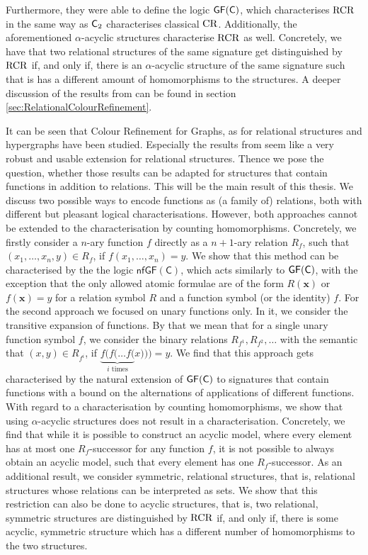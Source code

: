 Furthermore, they were able to define the logic $\mathsf{GF}(\mathsf{C})$, which characterises $\operatorname{RCR}$ in the same way as $\mathsf{C}_{2}$ characterises classical $\operatorname{CR}$.
Additionally, the aforementioned $\alpha$-acyclic structures characterise $\operatorname{RCR}$ as well.
Concretely, we have that two relational structures of the same signature get distinguished by $\operatorname{RCR}$ if, and only if, there is an $\alpha$-acyclic structure of the same signature such that is has a different amount of homomorphisms to the structures.
A deeper discussion of the results from \cite{scheidt2025ColorRefinement} can be found in section \ref{sec:RelationalColourRefinement}.

It can be seen that Colour Refinement for Graphs, as for relational structures and hypergraphs have been studied.
Especially the results from \cite{scheidt2025ColorRefinement} seem like a very robust and usable extension for relational structures.
Thence we pose the question, whether those results can be adapted for structures that contain functions in addition to relations.
This will be the main result of this thesis.
We discuss two possible ways to encode functions as (a family of) relations, both with different but pleasant logical characterisations.
However, both approaches cannot be extended to the characterisation by counting homomorphisms.
Concretely, we firstly consider a $n$-ary function $f$ directly as a $n+1$-ary relation $R_f$, such that $(x_1,\dots,x_n,y)\in R_f$, if $f(x_1,\dots,x_n)=y$.
We show that this method can be characterised by the the logic $\mathsf{nfGF}(\mathsf C)$, which acts similarly to $\mathsf{GF}(\mathsf{C})$, with the exception that the only allowed atomic formulae are of the form $R(\mathbf x)$ or $f(\mathbf x)=y$ for a relation symbol $R$ and a function symbol (or the identity) $f$.
For the second approach we focused on unary functions only.
In it, we consider the transitive expansion of functions.
By that we mean that for a single unary function symbol $f$, we consider the binary relations $R_{f^1},R_{f^2},\dots$ with the semantic that $(x,y)\in R_{f^i}$, if $\underbrace{f(f(\dots f(}_{i \text{ times}}x)))=y$.
We find that this approach gets characterised by the natural extension of $\mathsf{GF}(\mathsf{C})$ to signatures that contain functions with a bound on the alternations of applications of different functions.
With regard to a characterisation by counting homomorphisms, we show that using $\alpha$-acyclic structures does not result in a characterisation.
Concretely, we find that while it is possible to construct an acyclic model, where every element has at most one $R_f$-successor for any function $f$, it is not possible to always obtain an acyclic model, such that every element has one $R_f$-successor.
As an additional result, we consider symmetric, relational structures, that is, relational structures whose relations can be interpreted as sets.
We show that this restriction can also be done to acyclic structures, that is, two relational, symmetric structures are distinguished by $\operatorname{RCR}$ if, and only if, there is some acyclic, symmetric structure which has a different number of homomorphisms to the two structures.

